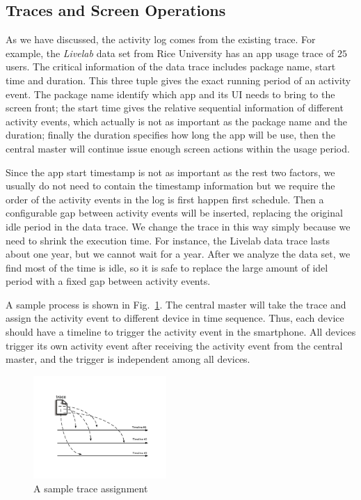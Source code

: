 \subsection{Traces and Screen Operations}
As we have discussed, the activity log comes from the existing trace. For example, the \emph{Livelab} data set from Rice University has an app usage trace of $25$ users. The critical information of the data trace includes package name, start time and duration. This three tuple gives the exact running period of an activity event. The package name identify which app and its UI needs to bring to the screen front; the start time gives the relative sequential information of different activity events, which actually is not as important as the package name and the duration; finally the duration specifies how long the app will be use, then the central master will continue issue enough screen actions within the usage period. 

Since the app start timestamp is not as important as the rest two factors, we usually do not need to contain the timestamp information but we require the order of the activity events in the log is first happen first schedule. Then a configurable gap between activity events will be inserted, replacing the original idle period in the data trace. We change the trace in this way simply because we need to shrink the execution time. For instance, the Livelab data trace lasts about one year, but we cannot wait for a year. After we analyze the data set, we find most of the time is idle, so it is safe to replace the large amount of idel period with a fixed gap between activity events.

A sample process is shown in Fig.~\ref{fig:big2}. The central master will take the trace and assign the activity event to different device in time sequence. Thus, each device should have a timeline to trigger the activity event in the smartphone. All devices trigger its own activity event after receiving the activity event from the central master, and the trigger is independent among all devices.

\begin{figure}
\centering
\includegraphics[width=0.45\textwidth]{figures/big-picture2.pdf}
\caption{A sample trace assignment}
\label{fig:big2}
\end{figure}


